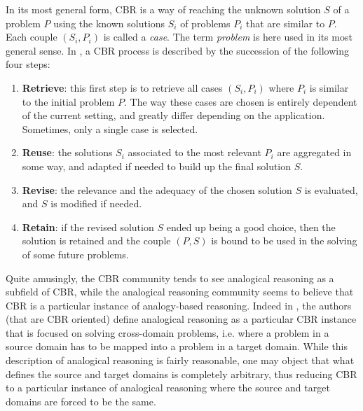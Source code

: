 In its most general form, CBR is a way of reaching the unknown solution $S$ of a
problem $P$ using the known solutions $S_i$ of problems $P_i$ that are similar
to $P$. Each couple $(S_i, P_i)$ is called a \textit{case}. The term
\textit{problem} is here used in its most general sense.  In \cite{AamPla94}, a
CBR process is described by the succession of the following four steps:
\begin{enumerate}
  \item \textbf{Retrieve}: this first step is to retrieve all cases $(S_i,
    P_i)$ where $P_i$ is similar to the initial problem $P$. The way these
    cases are chosen is entirely dependent of the current setting, and greatly
    differ depending on the application. Sometimes, only a single case  is
    selected.
  \item \textbf{Reuse}: the solutions $S_i$ associated to the most relevant
    $P_i$ are aggregated in some way, and adapted if needed to build up the
    final solution $S$.
  \item \textbf{Revise}: the relevance and the adequacy of the chosen solution
    $S$ is evaluated, and $S$ is modified if needed.
  \item \textbf{Retain}: if the revised solution $S$ ended up being a good
    choice, then the solution is retained and the couple $(P, S)$ is bound to
    be used in the solving of some future problems.
\end{enumerate}

Quite amusingly, the CBR community tends to see analogical reasoning as a
subfield of CBR, while the analogical reasoning community seems to believe that
CBR is a particular instance of analogy-based reasoning. Indeed in
\cite{AamPla94}, the authors (that are CBR oriented) define analogical
reasoning as a particular CBR instance that is focused on solving cross-domain
problems, i.e. where a problem in a source domain has to be mapped into a
problem in a target domain. While this description of analogical reasoning is
fairly reasonable, one may object that what defines the source and target
domains is completely arbitrary, thus reducing CBR to a particular instance of
analogical reasoning where the source and target domains are forced to be the
same.


